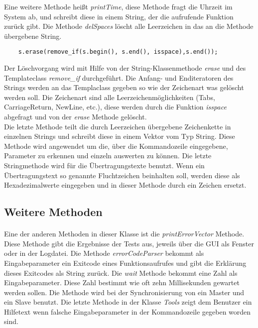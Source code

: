 Eine weitere Methode heißt \textit{printTime}, diese Methode fragt die Uhrzeit im System ab, und schreibt diese in einem String, der die aufrufende Funktion zurück gibt. Die Methode \textit{delSpaces} löscht alle Leerzeichen in das an die Methode übergebene String. 

\begin{lstlisting}
	s.erase(remove_if(s.begin(), s.end(), isspace),s.end());
\end{lstlisting}

Der Löschvorgang wird mit Hilfe von der String-Klassenmethode \textit{erase} und des Templateclass \textit{remove\_if} durchgeführt. Die Anfang- und Enditeratoren des Strings werden an das Templaclass gegeben so wie der Zeichenart was gelöscht werden soll. Die Zeichenart sind alle Leerzeichenmöglichkeiten (Tabs, CarriageReturn, NewLine, etc.), diese werden durch die Funktion \textit{isspace} abgefragt und von der \textit{erase} Methode gelöscht.\\

Die letzte Methode teilt die durch Leerzeichen übergebene Zeichenkette in einzelnen Strings und schreibt diese in einem Vektor vom Typ String. Diese Methode wird angewendet um die, über die Kommandozeile eingegebene, Parameter zu erkennen und einzeln auswerten zu können. Die letzte Stringmethode wird für die Übertragungstexte benutzt. Wenn ein Übertragungstext so genannte Fluchtzeichen beinhalten soll, werden diese als Hexadezimalwerte eingegeben und in dieser Methode durch ein Zeichen ersetzt.

\subsection{Weitere Methoden}
\paragraph{}
Eine der anderen Methoden in dieser Klasse ist die \textit{printErrorVector} Methode. Diese Methode gibt die Ergebnisse der Tests aus, jeweils über die GUI als Fenster oder in der Logdatei. Die Methode \textit{errorCodeParser} bekommt als Eingabeparameter ein Exitcode eines Funktionsaufrufes und gibt die Erklärung dieses Exitcodes als String zurück. Die \textit{wait} Methode bekommt eine Zahl als Eingabeparameter. Diese Zahl bestimmt wie oft zehn Millisekunden gewartet werden sollen. Die Methode wird bei der Synchronisierung von ein Master und ein Slave benutzt. Die letzte Methode in der Klasse \textit{Tools} zeigt dem Benutzer ein Hilfetext wenn falsche Eingabeparameter in der Kommandozeile gegeben worden sind.



